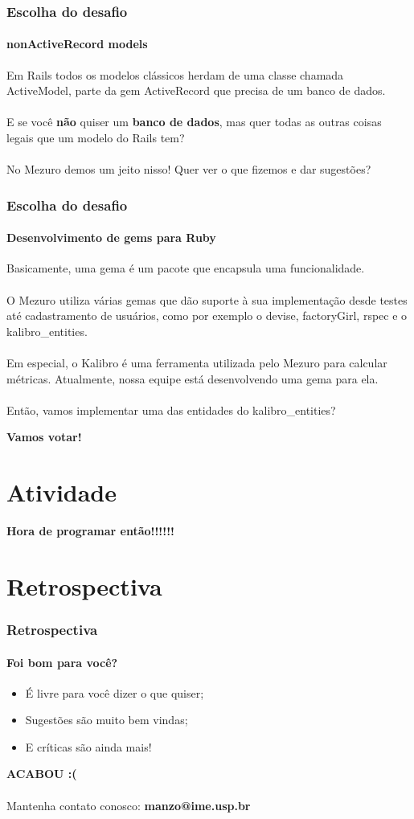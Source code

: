 \documentclass{beamer}
\begin{document}
\begin{frame}
  \frametitle{Escolha do desafio}
  \framesubtitle{nonActiveRecord models}

  Em Rails todos os modelos clássicos herdam de uma classe chamada ActiveModel, parte da gem ActiveRecord que precisa de um banco de dados. \\~\\

  E se você \textbf{não} quiser um \textbf{banco de dados}, mas quer todas as outras coisas legais que um modelo do Rails tem? \\~\\

  No Mezuro demos um jeito nisso! Quer ver o que fizemos e dar sugestões?
\end{frame}

\begin{frame}
  \frametitle{Escolha do desafio}
  \framesubtitle{Desenvolvimento de gems para Ruby}

  Basicamente, uma gema é um pacote que encapsula uma funcionalidade. \\~\\
  O Mezuro utiliza várias gemas que dão suporte à sua implementação desde testes até cadastramento de usuários, como por exemplo o devise, factoryGirl, rspec e o kalibro\_entities.\\~\\
  Em especial, o Kalibro é uma ferramenta utilizada pelo Mezuro para calcular métricas. Atualmente, nossa equipe está desenvolvendo uma gema para ela. \\~\\
  Então, vamos implementar uma das entidades do kalibro\_entities?

\end{frame}

\begin{frame}
  \LARGE{\textbf{Vamos votar!}}
\end{frame}

\section{Atividade}
\begin{frame}
  \LARGE{\textbf{Hora de programar então!!!!!!}}
\end{frame}

\section{Retrospectiva}
\begin{frame}
  \frametitle{Retrospectiva}
  \framesubtitle{Foi bom para você?}

  \begin{itemize}
    \item É livre para você dizer o que quiser;
    \item Sugestões são muito bem vindas;
    \item E críticas são ainda mais!
  \end{itemize}
\end{frame}

\begin{frame}
  \LARGE{\textbf{ACABOU :(}} \\~\\

  Mantenha contato conosco:
  \textbf{manzo@ime.usp.br}
\end{frame}
\end{document}
